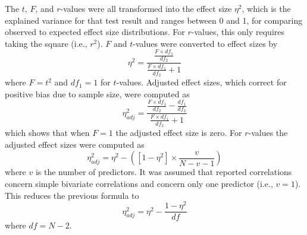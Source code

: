 \documentclass{article}
\begin{document}
The $t$, $F$, and $r$-values were all transformed into the effect size $\eta^2$, which is the explained variance for that test result and ranges between 0 and 1, for comparing observed to expected effect size distributions. For $r$-values, this only requires taking the square (i.e., $r^2$). $F$ and $t$-values were converted to effect sizes by
\begin{equation}
\eta^2=\frac{\frac{F\times df_1}{df_2}}{\frac{F\times df_1}{df_2}+1}
\label{eq:b1}
\end{equation}
where $F=t^2$ and $df_1=1$ for $t$-values. Adjusted effect sizes, which correct for positive bias due to sample size, were computed as
\begin{equation}
\eta^2_{adj}=\frac{\frac{F\times df_1}{df_2}-\frac{df_1}{df_2}}{\frac{F\times df_1}{df_2}+1}
\label{eq:b2}
\end{equation}
which shows that when $F=1$ the adjusted effect size is zero. For $r$-values the adjusted effect sizes were computed as \cite{Ivarsson2013-rm}
\begin{equation}
\eta^2_{adj}=\eta^2-([1-\eta^2]\times\frac{v}{N-v-1})
\label{eq:b3}
\end{equation}
where $v$ is the number of predictors. It was assumed that reported correlations concern simple bivariate correlations and concern only one predictor (i.e., $v=1$). This reduces the previous formula to
\begin{equation}
\eta^2_{adj}=\eta^2-\frac{1-\eta^2}{df}
\label{eq:b4}
\end{equation}
where $df=N-2$.

\end{document}
